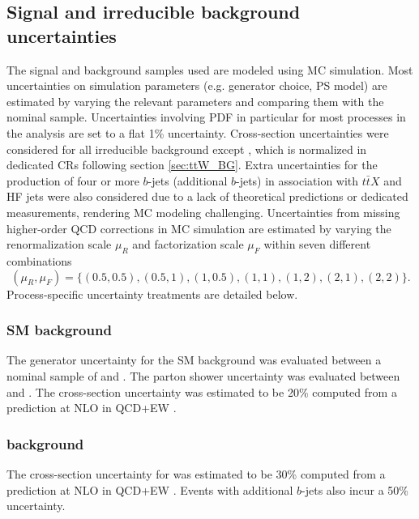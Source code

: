 \documentclass[../thesis.tex]{subfiles}
\begin{document}
\subsection{Signal and irreducible background uncertainties}
The signal and background samples used are modeled using \acs{MC} simulation. Most uncertainties on simulation parameters (e.g. generator choice, \acs{PS} model) are estimated by varying the relevant parameters and comparing them with the nominal sample. Uncertainties involving \acs{PDF} in particular for most processes in the analysis are set to a flat 1\% uncertainty. Cross-section uncertainties were considered for all irreducible background except \ttW, which is normalized in dedicated \acs{CR}s following section \ref{sec:ttW_BG}. 
Extra uncertainties for the production of four or more $b$-jets (additional $b$-jets) in association with $t\bar{t}X$ and \acs{HF} jets were also considered due to a lack of theoretical predictions or dedicated measurements, rendering \acs{MC} modeling challenging. Uncertainties from missing higher-order \acs{QCD} corrections in \acs{MC} simulation are estimated by varying the renormalization scale $\mu_R$ and factorization scale $\mu_F$ within seven different combinations
\[
(\mu_R, \mu_F) = \{(0.5,0.5), (0.5,1), (1,0.5), (1,1), (1,2), (2,1), (2,2)\}.
\]
Process-specific uncertainty treatments are detailed below.

\subsubsection*{SM \tttt background}
The generator uncertainty for the \acs{SM} \tttt background was evaluated between a nominal sample of \mgamc and \sherpa. The parton shower uncertainty was evaluated between \pythia and \herwig. The cross-section uncertainty was estimated to be 20\% computed from a prediction at \acs{NLO} in \acs{QCD}+\acs{EW} \citep{Frederix:2017wme}.

\subsubsection*{\ttt background}
The cross-section uncertainty for \ttt was estimated to be 30\% computed from a prediction at \acs{NLO} in \acs{QCD}+\acs{EW} \citep{Frederix:2017wme}. Events with additional $b$-jets also incur a 50\% uncertainty.
\end{document}

